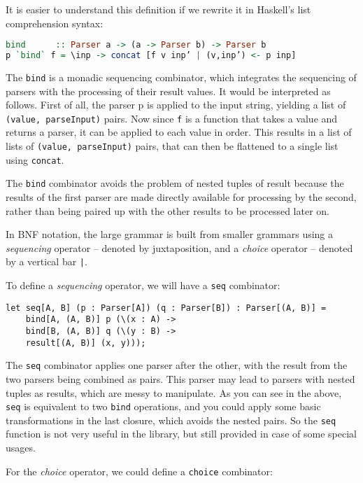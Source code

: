 It is easier to understand this definition if we rewrite it in Haskell's list comprehension syntax:

\begin{lstlisting}[language=Haskell]
bind      :: Parser a -> (a -> Parser b) -> Parser b
p `bind` f = \inp -> concat [f v inp’ | (v,inp’) <- p inp]
\end{lstlisting}

The \texttt{bind} is a monadic sequencing combinator, which integrates the sequencing of parsers with the processing of their result values. It would be interpreted as follows. First of all, the parser p is applied to the input string, yielding a list of \texttt{(value, parseInput)} pairs. Now since \texttt{f} is a function that takes a value and returns a parser, it can be applied to each value in order. This results in a list of lists of \texttt{(value, parseInput)} pairs, that can then be flattened to a single list using \texttt{concat}.

The \texttt{bind} combinator avoids the problem of nested tuples of result because the results of the first parser are made directly available for processing by the second, rather than being paired up with the other results to be processed later on.

In BNF notation, the large grammar is built from smaller grammars using a \textit{sequencing} operator -- denoted by juxtaposition, and a \textit{choice} operator -- denoted by a vertical bar \texttt{|}.

To define a \textit{sequencing} operator, we will have a \texttt{seq} combinator:

\begin{lstlisting}
let seq[A, B] (p : Parser[A]) (q : Parser[B]) : Parser[(A, B)] =
    bind[A, (A, B)] p (\(x : A) ->
    bind[B, (A, B)] q (\(y : B) ->
    result[(A, B)] (x, y)));
\end{lstlisting}

The \texttt{seq} combinator applies one parser after the other, with the result from the two parsers being combined as pairs. This parser may lead to parsers with nested tuples as results, which are messy to manipulate. As you can see in the above, \texttt{seq} is equivalent to two \texttt{bind} operations, and you could apply some basic transformations in the last closure, which avoids the nested pairs. So the \texttt{seq} function is not very useful in the library, but still provided in case of some special usages.

For the \textit{choice} operator, we could define a \texttt{choice} combinator:

